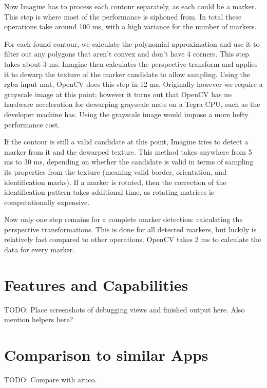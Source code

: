 Now Imagine has to process each contour separately, as each could be a marker.
This step is where most of the performance is siphoned from.
In total these operations take around 100 ms, with a high variance for the number of markers.

For each found contour, we calculate the polynomial approximation and use it to filter out any polygons that aren't convex and don't have 4 corners.
This step takes about 3 ms.
Imagine then calculates the perspective transform and applies it to dewarp the texture of the marker candidate to allow sampling.
Using the rgba input mat, OpenCV does this step in 12 ms.
Originally however we require a grayscale image at this point; however it turns out that OpenCV has no hardware acceleration for dewarping grayscale mats on a Tegra CPU, such as the developer machine has.
Using the grayscale image would impose a more hefty performance cost.

If the contour is still a valid candidate at this point, Imagine tries to detect a marker from it and the dewarped texture.
This method takes anywhere from 5 ms to 30 ms, depending on whether the candidate is valid in terms of sampling its properties from the texture (meaning valid border, orientation, and identification marks).
If a marker is rotated, then the correction of the identification pattern takes additional time, as rotating matrices is computationally expensive.

Now only one step remains for a complete marker detection: calculating the perspective transformations.
This is done for all detected markers, but luckily is relatively fast compared to other operations.
OpenCV takes 2 ms to calculate the data for every marker.

\section{Features and Capabilities}

TODO: Place screenshots of debugging views and finished output here.
Also mention helpers here?

\section{Comparison to similar Apps}

TODO: Compare with aruco.
